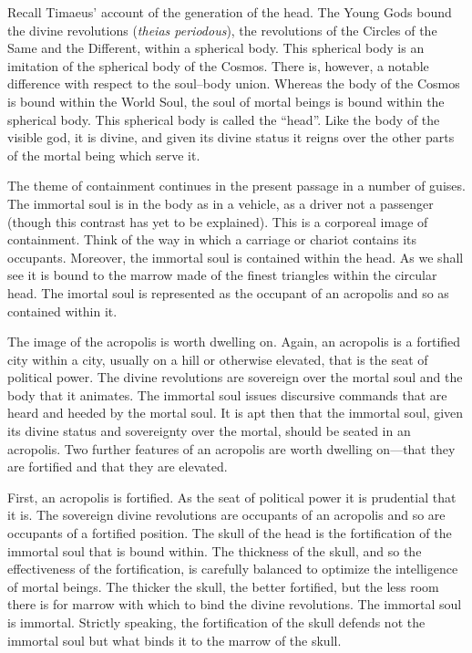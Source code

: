 Recall Timaeus' account of the generation of the head. The Young Gods bound the divine revolutions (\emph{theias periodous}), the revolutions of the Circles of the Same and the Different, within a spherical body. This spherical body is an imitation of the spherical body of the Cosmos. There is, however, a notable difference with respect to the soul–body union. Whereas the body of the Cosmos is bound within the World Soul, the soul of mortal beings is bound within the spherical body. This spherical body is called the “head”. Like the body of the visible god, it is divine, and given its divine status it reigns over the other parts of the mortal being which serve it.

The theme of containment continues in the present passage in a number of guises. The immortal soul is in the body as in a vehicle, as a driver not a passenger (though this contrast has yet to be explained). This is a corporeal image of containment. Think of the way in which a carriage or chariot contains its occupants. Moreover, the immortal soul is contained within the head. As we shall see it is bound to the marrow made of the finest triangles within the circular head. The imortal soul is represented as the occupant of an acropolis and so as contained within it. 

The image of the acropolis is worth dwelling on. Again, an acropolis is a fortified city within a city, usually on a hill or otherwise elevated, that is the seat of political power. The divine revolutions are sovereign over the mortal soul and the body that it animates. The immortal soul issues discursive commands that are heard and heeded by the mortal soul. It is apt then that the immortal soul, given its divine status and sovereignty over the mortal, should be seated in an acropolis. Two further features of an acropolis are worth dwelling on---that they are fortified and that they are elevated.

First, an acropolis is fortified. As the seat of political power it is prudential that it is. The sovereign divine revolutions are occupants of an acropolis and so are occupants of a fortified position. The skull of the head is the fortification of the immortal soul that is bound within. The thickness of the skull, and so the effectiveness of the fortification, is carefully balanced to optimize the intelligence of mortal beings. The thicker the skull, the better fortified, but the less room there is for marrow with which to bind the divine revolutions. The immortal soul is immortal. Strictly speaking, the fortification of the skull defends not the immortal soul but what binds it to the marrow of the skull. 

